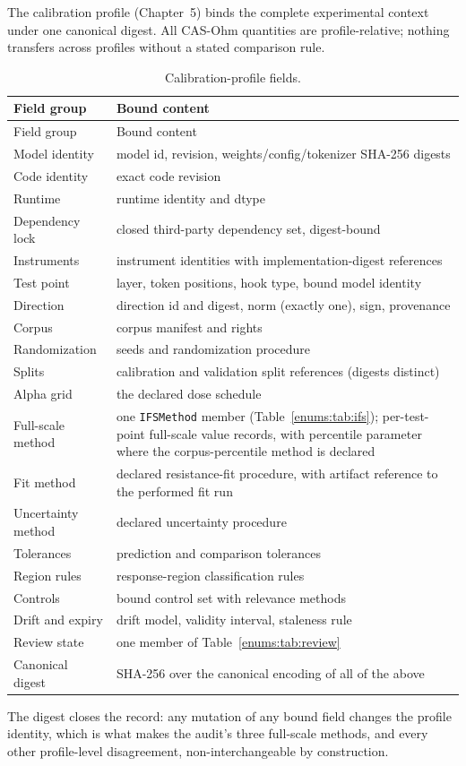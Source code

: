The calibration profile (Chapter~5) binds the complete experimental context under one canonical digest. All CAS-Ohm quantities are profile-relative; nothing transfers across profiles without a stated comparison rule.

\begin{longtable}{@{}ll@{}}
\caption{Calibration-profile fields.}\label{enums:tab:profile}\\
\toprule
Field group & Bound content \\
\midrule
\endfirsthead
\toprule
Field group & Bound content \\
\midrule
\endhead
\bottomrule
\endfoot
Model identity & model id, revision, weights/config/tokenizer SHA-256 digests \\
Code identity & exact code revision \\
Runtime & runtime identity and dtype \\
Dependency lock & closed third-party dependency set, digest-bound \\
Instruments & instrument identities with implementation-digest references \\
Test point & layer, token positions, hook type, bound model identity \\
Direction & direction id and digest, norm (exactly one), sign, provenance \\
Corpus & corpus manifest and rights \\
Randomization & seeds and randomization procedure \\
Splits & calibration and validation split references (digests distinct) \\
Alpha grid & the declared dose schedule \\
Full-scale method & one \texttt{IFSMethod} member (Table~\ref{enums:tab:ifs}); per-test-point full-scale value records, with percentile parameter where the corpus-percentile method is declared \\
Fit method & declared resistance-fit procedure, with artifact reference to the performed fit run \\
Uncertainty method & declared uncertainty procedure \\
Tolerances & prediction and comparison tolerances \\
Region rules & response-region classification rules \\
Controls & bound control set with relevance methods \\
Drift and expiry & drift model, validity interval, staleness rule \\
Review state & one member of Table~\ref{enums:tab:review} \\
Canonical digest & SHA-256 over the canonical encoding of all of the above \\
\end{longtable}

The digest closes the record: any mutation of any bound field changes the profile identity, which is what makes the audit's three full-scale methods, and every other profile-level disagreement, non-interchangeable by construction.
